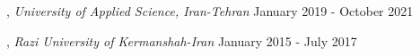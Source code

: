 
, \textit{University of Applied Science, Iran-Tehran}	\hfill January 2019 - October 2021

, \textit{Razi University of Kermanshah-Iran} \hfill	January 2015 - July 2017
